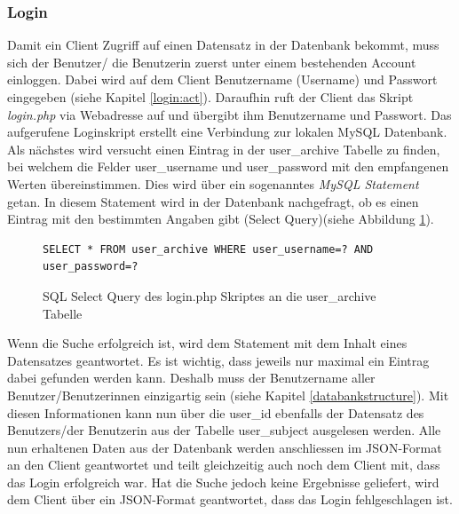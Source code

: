 \documentclass[a4paper,11pt]{report}
\begin{document}
					\subsubsection{Login}\label{login:php}
					Damit ein Client Zugriff auf einen Datensatz in der Datenbank bekommt, muss sich der Benutzer/ die Benutzerin zuerst unter einem bestehenden Account einloggen. Dabei wird auf dem Client Benutzername (Username) und Passwort eingegeben (siehe Kapitel \ref{login:act}). Daraufhin ruft der Client das Skript \emph{login.php} via Webadresse auf und übergibt ihm Benutzername und Passwort. Das aufgerufene Loginskript erstellt eine Verbindung zur lokalen MySQL Datenbank. Als nächstes wird versucht einen Eintrag in der user\_archive Tabelle zu finden, bei welchem die Felder user\_username und user\_password mit den empfangenen Werten übereinstimmen. Dies wird über ein sogenanntes \emph{MySQL Statement} getan. In diesem Statement wird in der Datenbank nachgefragt, ob es einen Eintrag mit den bestimmten Angaben gibt (Select Query)(siehe Abbildung \ref{SQL:SELECT}).
				\begin{figure}
					\begin{center}
						\begin{verbatim}
SELECT * FROM user_archive WHERE user_username=? AND user_password=?
						\end{verbatim}
						\caption{SQL Select Query des login.php Skriptes an die user\_archive Tabelle}\label{SQL:SELECT}
					\end{center}
				\end{figure}
					Wenn die Suche erfolgreich ist, wird dem Statement mit dem Inhalt eines Datensatzes geantwortet. Es ist wichtig, dass jeweils nur maximal ein Eintrag dabei gefunden werden kann. Deshalb muss der Benutzername aller Benutzer/Benutzerinnen einzigartig sein (siehe Kapitel \ref{databankstructure}). Mit diesen Informationen kann nun über die user\_id ebenfalls der Datensatz des Benutzers/der Benutzerin aus der Tabelle user\_subject ausgelesen werden. Alle nun erhaltenen Daten aus der Datenbank werden anschliessen im JSON-Format an den Client geantwortet und teilt gleichzeitig auch noch dem Client mit, dass das Login erfolgreich war. Hat die Suche jedoch keine Ergebnisse geliefert, wird dem Client über ein JSON-Format geantwortet, dass das Login fehlgeschlagen ist.
					
\end{document}
